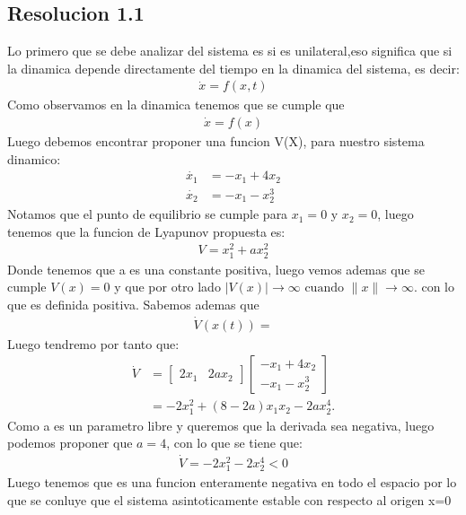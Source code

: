 \documentclass[
  11pt,
  letterpaper,
   addpoints,
   answers
  ]{exam}
\begin{document}
\begin{questions}
\begin{solution}
    \subsection*{Resolucion 1.1}
    Lo primero que se debe analizar del sistema es si es unilateral,eso significa que si la dinamica depende directamente del tiempo en la dinamica del sistema, es decir:
    \begin{align}
        \dot{x} = f(x,t)
    \end{align}
    Como observamos en la dinamica tenemos que se cumple que 
    \begin{align}
        \dot{x} = f(x)
    \end{align}
    Luego debemos encontrar proponer una funcion V(X), para nuestro sistema dinamico:
    \begin{align}
        \dot{x_{1}} &= -x_{1} + 4x_{2}\\
        \dot{x_{2}} &= -x_{1} - x_{2}^{3}
    \end{align}
    Notamos que el punto de equilibrio se cumple para $x_{1} = 0$ y $x_{2} = 0$, luego tenemos que la funcion de Lyapunov propuesta es:
    \begin{align}
        V=x_{1}^{2} + ax_{2}^{2} 
    \end{align}
    Donde tenemos que a es una constante positiva, luego vemos ademas que se cumple $V(x)=0$ y que por otro lado $|V(x)| \to \infty \text{ cuando } \|x\| \to \infty. $ con lo que es definida positiva. Sabemos ademas que 
    \begin{align}
        \dot{V}(x(t)) = 
    \end{align}
    Luego tendremo por tanto que:
        \begin{align}
            \dot{V} &= \begin{bmatrix} 2x_1 & 2ax_2 \end{bmatrix} \begin{bmatrix} -x_1 + 4x_2 \\ -x_1 - x_2^3 \end{bmatrix} \\
            &= -2x_1^2 + (8 - 2a)x_1 x_2 - 2ax_2^4.
        \end{align}
    Como a es un parametro libre y queremos que la derivada sea negativa, luego podemos proponer que $a=4$, con lo que se tiene que:
    \begin{align}
        \dot{V} = -2x_{1}^{2} - 2x_{2}^{4} < 0
    \end{align}
    Luego tenemos que es una funcion enteramente negativa en todo el espacio por lo que se conluye que el sistema asintoticamente estable con respecto al origen x=0

\end{solution}
\end{questions}
\end{document}
